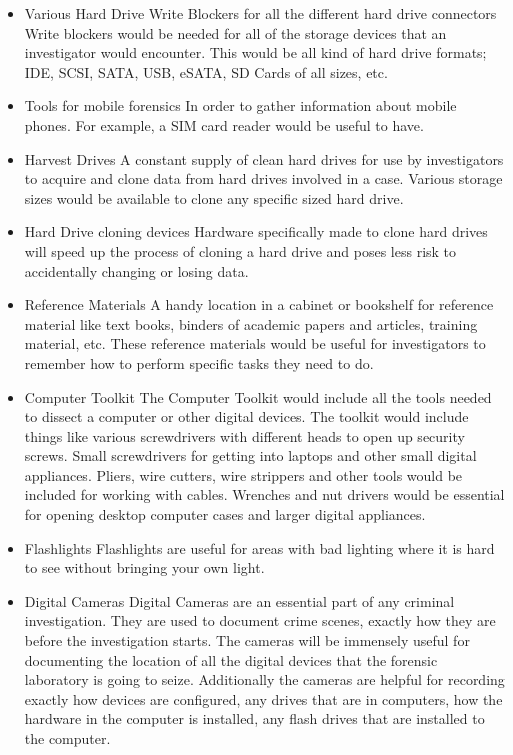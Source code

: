 \documentclass{article}
\begin{document}
\begin{itemize}
\item
Various Hard Drive Write Blockers for all the different hard drive connectors
\subitem
Write blockers would be needed for all of the storage devices that an investigator would encounter.
This would be all kind of hard drive formats; IDE, SCSI, SATA, USB, eSATA, SD Cards of all sizes, etc.
\item
Tools for mobile forensics
\subitem
In order to gather information about mobile phones. For example, a SIM card reader would be useful to have.
\item 
Harvest Drives
\subitem 
A constant supply of clean hard drives for use by investigators to acquire and clone data from hard drives involved in a case.
Various storage sizes would be available to clone any specific sized hard drive.
\item 
Hard Drive cloning devices
\subitem 
Hardware specifically made to clone hard drives will speed up the process of cloning a hard drive and poses less risk to accidentally changing or losing data.
\item 
Reference Materials
\subitem 
A handy location in a cabinet or bookshelf for reference material like text books, binders of academic papers and articles, training material, etc.
These reference materials would be useful for investigators to remember how to perform specific tasks they need to do.
\item 
Computer Toolkit
\subitem 
The Computer Toolkit would include all the tools needed to dissect a computer or other digital devices.
The toolkit would include things like various screwdrivers with different heads to open up security screws. 
Small screwdrivers for getting into laptops and other small digital appliances. 
Pliers, wire cutters, wire strippers and other tools would be included for working with cables. 
Wrenches and nut drivers would be essential for opening desktop computer cases and larger digital appliances. 
\item 
Flashlights
\subitem 
Flashlights are useful for areas with bad lighting where it is hard to see without bringing your own light. 
\item 
Digital Cameras
\subitem
Digital Cameras are an essential part of any criminal investigation.
They are used to document crime scenes, exactly how they are before the investigation starts. 
The cameras will be immensely useful for documenting the location of all the digital devices that the forensic laboratory is going to seize. 
Additionally the cameras are helpful for recording exactly how devices are configured, any drives that are in computers, how the hardware in the computer is installed, any flash drives that are installed to the computer.

\end{itemize}
\end{document}
